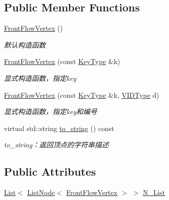 \subsection*{Public Member Functions}
\begin{DoxyCompactItemize}
\item 
\hyperlink{struct_introduction_to_algorithm_1_1_graph_algorithm_1_1_front_flow_vertex_a9890efaa1818c914f138ac063b679fe2}{Front\+Flow\+Vertex} ()
\begin{DoxyCompactList}\small\item\em 默认构造函数 \end{DoxyCompactList}\item 
\hyperlink{struct_introduction_to_algorithm_1_1_graph_algorithm_1_1_front_flow_vertex_af6c0dd18f309fdc4f6cd475a3f629f70}{Front\+Flow\+Vertex} (const \hyperlink{struct_introduction_to_algorithm_1_1_graph_algorithm_1_1_flow_vertex_a014b25c20124a24525ef7db0588466b9}{Key\+Type} \&k)
\begin{DoxyCompactList}\small\item\em 显式构造函数，指定{\ttfamily key} \end{DoxyCompactList}\item 
\hyperlink{struct_introduction_to_algorithm_1_1_graph_algorithm_1_1_front_flow_vertex_ae9af6850fbdfa4c8a192ea66778e6b59}{Front\+Flow\+Vertex} (const \hyperlink{struct_introduction_to_algorithm_1_1_graph_algorithm_1_1_flow_vertex_a014b25c20124a24525ef7db0588466b9}{Key\+Type} \&k, \hyperlink{struct_introduction_to_algorithm_1_1_graph_algorithm_1_1_flow_vertex_ae48ab0918590bd6a6763d007694ff161}{V\+I\+D\+Type} d)
\begin{DoxyCompactList}\small\item\em 显式构造函数，指定{\ttfamily key}和编号 \end{DoxyCompactList}\item 
virtual std\+::string \hyperlink{struct_introduction_to_algorithm_1_1_graph_algorithm_1_1_front_flow_vertex_a3edfb3a6f29475f338340291ad71eab9}{to\+\_\+string} () const 
\begin{DoxyCompactList}\small\item\em to\+\_\+string：返回顶点的字符串描述 \end{DoxyCompactList}\end{DoxyCompactItemize}
\subsection*{Public Attributes}
\begin{DoxyCompactItemize}
\item 
\hyperlink{struct_introduction_to_algorithm_1_1_graph_algorithm_1_1_list}{List}$<$ \hyperlink{struct_introduction_to_algorithm_1_1_graph_algorithm_1_1_list_node}{List\+Node}$<$ \hyperlink{struct_introduction_to_algorithm_1_1_graph_algorithm_1_1_front_flow_vertex}{Front\+Flow\+Vertex} $>$ $>$ \hyperlink{struct_introduction_to_algorithm_1_1_graph_algorithm_1_1_front_flow_vertex_ad66fead451e2af4756f0fd7a644e1319}{N\+\_\+\+List}
\end{DoxyCompactItemize}


